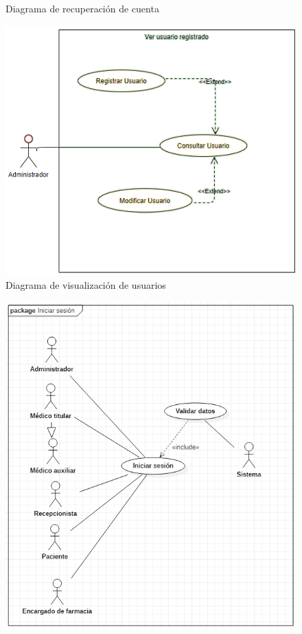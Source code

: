 \documentclass[12pt,letterpaper]{article}
\begin{document}
{\begin{figure}[H]
            \caption{Diagrama de recuperación de cuenta}
        \end{figure}
        \begin{figure}[H]
            \centering
            \includegraphics [scale=0.3]{verUsuario}
            \caption{Diagrama de visualización de usuarios}
        \end{figure}
        \begin{figure}[H]
            \centering
            \includegraphics [scale=0.3]{iniciarSesion}

\end{figure}}
\end{document}
